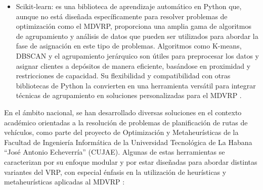 \begin{itemize}
  \item Scikit-learn: es una biblioteca de aprendizaje automático en Python que, aunque no está dise\~nada específicamente para resolver problemas de optimización como el MDVRP, proporciona una amplia gama de algoritmos de agrupamiento y análisis de datos que pueden ser utilizados para abordar la fase de asignación en este tipo de problemas. Algoritmos como K-means, DBSCAN y el agrupamiento jerárquico son útiles para preprocesar los datos y asignar clientes a depósitos de manera eficiente, basándose en proximidad y restricciones de capacidad. Su flexibilidad y compatibilidad con otras bibliotecas de Python la convierten en una herramienta versátil para integrar técnicas de agrupamiento en soluciones personalizadas para el MDVRP  \parencite{f.pedregosaScikitlearnMachineLearning2011}.
\end{itemize}

En el ámbito nacional, se han desarrollado diversas soluciones en el contexto académico orientadas a la resolución de problemas de planificación de rutas de vehículos, como parte del proyecto de Optimización y Metaheurísticas de la Facultad de Ingeniería Informática de la Universidad Tecnológica de La Habana ``José Antonio Echeverría'' (CUJAE). Algunas de estas herramientas se caracterizan por su enfoque modular y por estar dise\~nadas para abordar distintas variantes del VRP, con especial énfasis en la utilización de heurísticas y metaheurísticas aplicadas al MDVRP \parencite{ericramosaragonIncorporacionModuloMetricas2025}:

